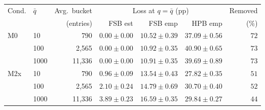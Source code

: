 \begin{tabular}{llrrrrr}
\toprule
Cond. & $\bar q$ & Avg.\ bucket & \multicolumn{3}{c}{Loss at $q=\bar q$ (pp)} & Removed \\
\cmidrule(lr){4-6}
 & & (entries) & FSB est & FSB emp & HPB emp & (\%) \\
\midrule
M0 & 10 & 790 & $0.00 \pm 0.00$ & $10.52 \pm 0.39$ & $37.09 \pm 0.56$ & $72$ \\
 & 100 & 2,565 & $0.00 \pm 0.00$ & $10.92 \pm 0.35$ & $40.90 \pm 0.65$ & $73$ \\
 & 1000 & 11,336 & $0.00 \pm 0.00$ & $10.91 \pm 0.35$ & $39.69 \pm 0.89$ & $73$ \\
\midrule
M2x & 10 & 790 & $0.96 \pm 0.09$ & $13.54 \pm 0.43$ & $27.82 \pm 0.35$ & $51$ \\
 & 100 & 2,565 & $2.10 \pm 0.24$ & $14.79 \pm 0.69$ & $30.70 \pm 0.40$ & $52$ \\
 & 1000 & 11,336 & $3.89 \pm 0.23$ & $16.59 \pm 0.35$ & $29.84 \pm 0.27$ & $44$ \\
\bottomrule
\end{tabular}
